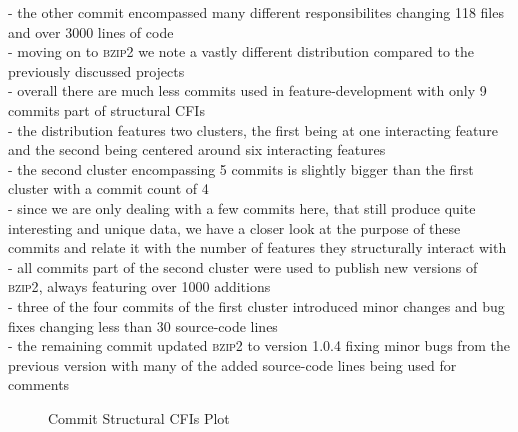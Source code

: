 - the other commit encompassed many different responsibilites changing 118 files and over 3000 lines of code \\
- moving on to \textsc{bzip2} we note a vastly different distribution compared to the previously discussed projects \\
- overall there are much less commits used in feature-development with only 9 commits part of structural CFIs \\
- the distribution features two clusters, the first being at one interacting feature and the second being centered around six interacting features \\
- the second cluster encompassing 5 commits is slightly bigger than the first cluster with a commit count of 4 \\
- since we are only dealing with a few commits here, that still produce quite interesting and unique data, we have a closer look at the purpose of these commits and relate it with the number of features they structurally interact with \\ 
- all commits part of the second cluster were used to publish new versions of \textsc{bzip2}, always featuring over 1000 additions \\
- three of the four commits of the first cluster introduced minor changes and bug fixes changing less than 30 source-code lines \\
- the remaining commit updated \textsc{bzip2} to version 1.0.4 fixing minor bugs from the previous version with many of the added source-code lines being used for comments \\

\clearpage

\begin{figure}[htbp]
  \centering
  
  \caption{Commit Structural CFIs Plot}
  \label{fig:commit_sfbr_plot}
\end{figure}

